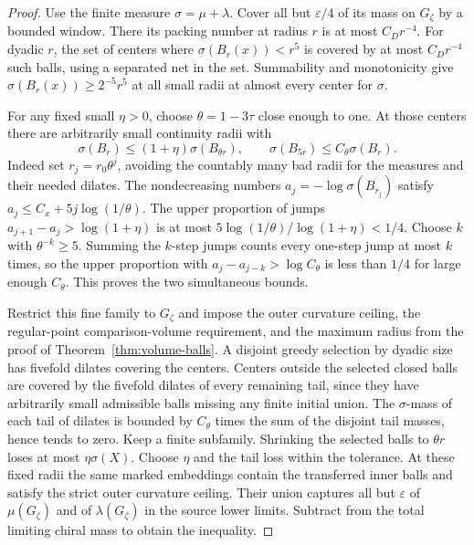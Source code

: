 \begin{proof}
Use the finite measure \(\sigma=\mu+\lambda\). Cover all but
\(\varepsilon/4\) of its mass on \(G_\zeta\) by a bounded window.
There its packing number at radius \(r\) is at most \(C_Dr^{-4}\).
For dyadic \(r\), the set of centers where
\(\sigma(B_r(x))<r^5\) is covered by at most \(C_Dr^{-4}\) such
balls, using a separated net in the set. Summability and
monotonicity give \(\sigma(B_r(x))\ge 2^{-5}r^5\) at all small
radii at almost every center for \(\sigma\).

For any fixed small \(\eta>0\), choose \(\theta=1-3\tau\) close
enough to one. At those centers there are arbitrarily small
continuity radii with
\[
 \sigma(B_r)\le(1+\eta)\sigma(B_{\theta r}),\qquad
 \sigma(B_{5r})\le C_\theta\sigma(B_r).
\]
Indeed set \(r_j=r_0\theta^j\), avoiding the countably many bad
radii for the measures and their needed dilates. The nondecreasing
numbers \(a_j=-\log\sigma(B_{r_j})\) satisfy
\(a_j\le C_x+5j\log(1/\theta)\). The upper proportion of jumps
\(a_{j+1}-a_j>\log(1+\eta)\) is at most
\(5\log(1/\theta)/\log(1+\eta)<1/4\). Choose \(k\) with
\(\theta^{-k}\ge5\). Summing the \(k\)-step jumps counts every
one-step jump at most \(k\) times, so the upper proportion with
\(a_j-a_{j-k}>\log C_\theta\) is less than \(1/4\) for large enough
\(C_\theta\). This proves the two simultaneous bounds.

Restrict this fine family to \(G_\zeta\) and impose the outer
curvature ceiling, the regular-point comparison-volume requirement,
and the maximum radius from the proof of Theorem~\ref{thm:volume-balls}.
A disjoint greedy selection by dyadic size has fivefold dilates
covering the centers. Centers outside the selected closed balls are
covered by the fivefold dilates of every remaining tail, since they
have arbitrarily small admissible balls missing any finite initial
union. The \(\sigma\)-mass of each tail of dilates is bounded by
\(C_\theta\) times the sum of the disjoint tail masses, hence tends
to zero. Keep a finite subfamily. Shrinking the selected balls to
\(\theta r\) loses at most \(\eta\sigma(X)\). Choose \(\eta\) and
the tail loss within the tolerance. At these fixed radii the same
marked embeddings contain the transferred inner balls and satisfy
the strict outer curvature ceiling. Their union captures all but
\(\varepsilon\) of \(\mu(G_\zeta)\) and of \(\lambda(G_\zeta)\)
in the source lower limits. Subtract from the total limiting chiral
mass to obtain the inequality.
\end{proof}
